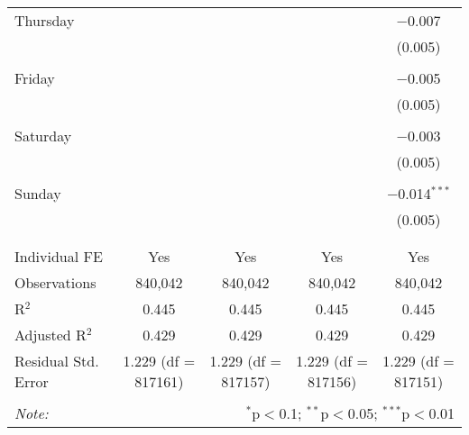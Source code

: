 \documentclass[
]{article}
\begin{document}
\begin{table}[!htbp]
{\begin{tabular}{@{\extracolsep{5pt}}lcccc}
 Thursday &  &  &  & $-$0.007 \\ 
  &  &  &  & (0.005) \\ 
  & & & & \\ 
 Friday &  &  &  & $-$0.005 \\ 
  &  &  &  & (0.005) \\ 
  & & & & \\ 
 Saturday &  &  &  & $-$0.003 \\ 
  &  &  &  & (0.005) \\ 
  & & & & \\ 
 Sunday &  &  &  & $-$0.014$^{***}$ \\ 
  &  &  &  & (0.005) \\ 
  & & & & \\ 
\hline \\[-1.8ex] 
Individual FE & Yes & Yes & Yes & Yes \\ 
Observations & 840,042 & 840,042 & 840,042 & 840,042 \\ 
R$^{2}$ & 0.445 & 0.445 & 0.445 & 0.445 \\ 
Adjusted R$^{2}$ & 0.429 & 0.429 & 0.429 & 0.429 \\ 
Residual Std. Error & 1.229 (df = 817161) & 1.229 (df = 817157) & 1.229 (df = 817156) & 1.229 (df = 817151) \\ 
\hline 
\hline \\[-1.8ex] 
\textit{Note:}  & \multicolumn{4}{r}{$^{*}$p$<$0.1; $^{**}$p$<$0.05; $^{***}$p$<$0.01} \\ 
\end{tabular}
} 
\end{table} 
\newpage
\end{document}
